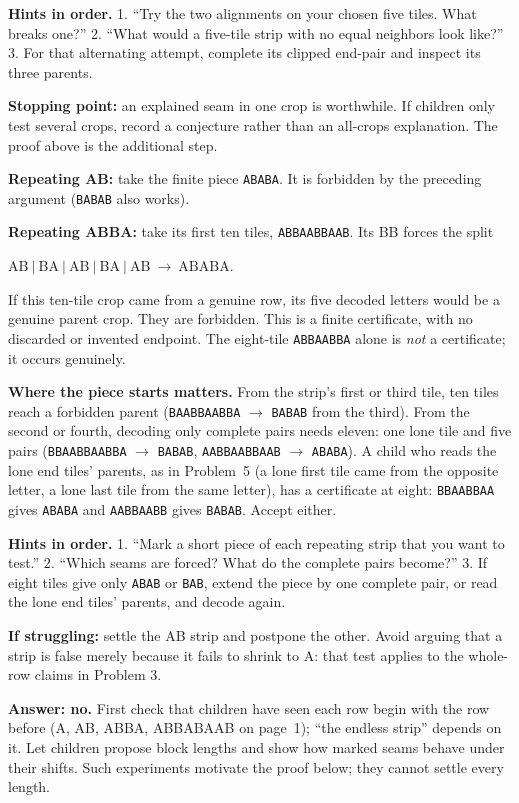 \documentclass[11pt,letterpaper]{article}
\newcommand{\head}[1]{\par\vspace{5pt}{\large\bfseries #1}\par\nopagebreak\vspace{1pt}}
\newcommand{\problem}[2]{\par\vspace{5pt}{\bfseries Problem #1\quad #2}\par\nopagebreak}
\newcommand{\word}[1]{\texttt{#1}}
\newcommand{\hint}[1]{\textbf{Hints in order.} #1}
\newcommand{\chain}[1]{\par\hspace{8pt}$#1$\par}
\begin{document}
\hint{1. ``Try the two alignments on your chosen five tiles. What breaks one?'' 2. ``What would a five-tile strip with no equal neighbors look like?'' 3. For that alternating attempt, complete its clipped end-pair and inspect its three parents.}

\textbf{Stopping point:} an explained seam in one crop is worthwhile. If children only test several crops, record a conjecture rather than an all-crops explanation. The proof above is the additional step.

\problem{6}{Further, student page 4}
\textbf{Repeating AB:} take the finite piece \word{ABABA}. It is forbidden by the preceding argument (\word{BABAB} also works).\par
\textbf{Repeating ABBA:} take its first ten tiles, \word{ABBAABBAAB}. Its BB forces the split
\chain{\mathrm{AB\ |\ BA\ |\ AB\ |\ BA\ |\ AB}\ \longrightarrow\ \mathrm{ABABA}.}
If this ten-tile crop came from a genuine row, its five decoded letters would be a genuine parent crop. They are forbidden. This is a finite certificate, with no discarded or invented endpoint. The eight-tile \word{ABBAABBA} alone is \emph{not} a certificate; it occurs genuinely.

\textbf{Where the piece starts matters.} From the strip's first or third tile, ten tiles reach a forbidden parent (\word{BAABBAABBA} $\to$ \word{BABAB} from the third). From the second or fourth, decoding only complete pairs needs eleven: one lone tile and five pairs (\word{BBAABBAABBA} $\to$ \word{BABAB}, \word{AABBAABBAAB} $\to$ \word{ABABA}). A child who reads the lone end tiles' parents, as in Problem~5 (a lone first tile came from the opposite letter, a lone last tile from the same letter), has a certificate at eight: \word{BBAABBAA} gives \word{ABABA} and \word{AABBAABB} gives \word{BABAB}. Accept either.

\hint{1. ``Mark a short piece of each repeating strip that you want to test.'' 2. ``Which seams are forced? What do the complete pairs become?'' 3. If eight tiles give only \word{ABAB} or \word{BAB}, extend the piece by one complete pair, or read the lone end tiles' parents, and decode again.}

\textbf{If struggling:} settle the AB strip and postpone the other. Avoid arguing that a strip is false merely because it fails to shrink to A: that test applies to the whole-row claims in Problem 3.

\head{The endless word and the adult proof}
\problem{7}{Adult-supported continuation, student page 4}
\textbf{Answer: no.} First check that children have seen each row begin with the row before (A, AB, ABBA, ABBABAAB on page~1); ``the endless strip'' depends on it. Let children propose block lengths and show how marked seams behave under their shifts. Such experiments motivate the proof below; they cannot settle every length.
\end{document}
